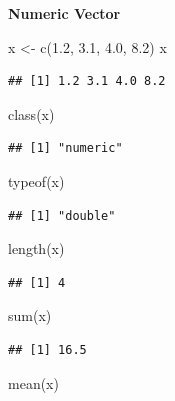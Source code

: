 \documentclass[
]{article}
\newenvironment{Shaded}{\begin{snugshade}}{\end{snugshade}}
\newcommand{\FloatTok}[1]{\textcolor[rgb]{0.00,0.00,0.81}{#1}}
\newcommand{\FunctionTok}[1]{\textcolor[rgb]{0.00,0.00,0.00}{#1}}
\newcommand{\NormalTok}[1]{#1}
\newcommand{\OtherTok}[1]{\textcolor[rgb]{0.56,0.35,0.01}{#1}}
\begin{document}
\textbf{Numeric Vector}

\begin{Shaded}
\begin{Highlighting}[]
\NormalTok{x }\OtherTok{\textless{}{-}} \FunctionTok{c}\NormalTok{(}\FloatTok{1.2}\NormalTok{, }\FloatTok{3.1}\NormalTok{, }\FloatTok{4.0}\NormalTok{, }\FloatTok{8.2}\NormalTok{)}
\NormalTok{x}
\end{Highlighting}
\end{Shaded}

\begin{verbatim}
## [1] 1.2 3.1 4.0 8.2
\end{verbatim}

\begin{Shaded}
\begin{Highlighting}[]
\FunctionTok{class}\NormalTok{(x)}
\end{Highlighting}
\end{Shaded}

\begin{verbatim}
## [1] "numeric"
\end{verbatim}

\begin{Shaded}
\begin{Highlighting}[]
\FunctionTok{typeof}\NormalTok{(x)}
\end{Highlighting}
\end{Shaded}

\begin{verbatim}
## [1] "double"
\end{verbatim}

\begin{Shaded}
\begin{Highlighting}[]
\FunctionTok{length}\NormalTok{(x)}
\end{Highlighting}
\end{Shaded}

\begin{verbatim}
## [1] 4
\end{verbatim}

\begin{Shaded}
\begin{Highlighting}[]
\FunctionTok{sum}\NormalTok{(x)}
\end{Highlighting}
\end{Shaded}

\begin{verbatim}
## [1] 16.5
\end{verbatim}

\begin{Shaded}
\begin{Highlighting}[]
\FunctionTok{mean}\NormalTok{(x)}
\end{Highlighting}
\end{Shaded}
\end{document}
